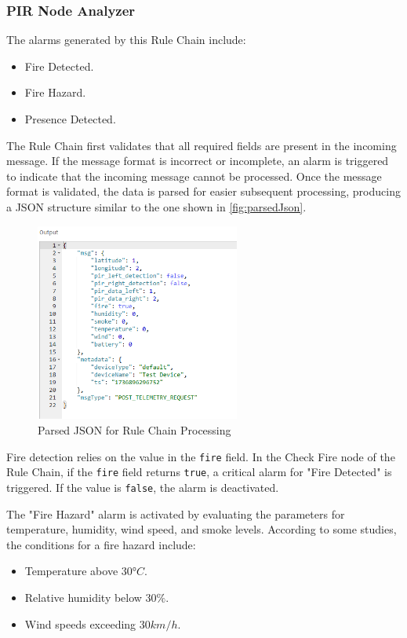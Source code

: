 \subsubsection*{PIR Node Analyzer}
The alarms generated by this Rule Chain include:
\begin{itemize}
    \item Fire Detected.
    \item Fire Hazard.
    \item Presence Detected.
\end{itemize}

The Rule Chain first validates that all required fields are present in the incoming message. If the message format is incorrect or incomplete, an alarm is triggered 
to indicate that the incoming message cannot be processed. Once the message format is validated, the data is parsed for easier subsequent processing, producing a JSON
structure similar to the one shown in \autoref{fig:parsedJson}.

\begin{figure}[H]
    \centering
    \includegraphics[width=0.6\textwidth]{./images/8/jsonParsed.PNG}
    \caption{Parsed JSON for Rule Chain Processing}
    \label{fig:parsedJson}
\end{figure}

Fire detection relies on the value in the \texttt{fire} field. In the Check Fire node of the Rule Chain, if the \texttt{fire} field returns \texttt{true}, a critical alarm for "Fire Detected"
is triggered. If the value is \texttt{false}, the alarm is deactivated.

The "Fire Hazard" alarm is activated by evaluating the parameters for temperature, humidity, wind speed, and smoke levels. According to some studies\cite{norma303030tres}, the conditions 
for a fire hazard include:
\begin{itemize}
    \item Temperature above $30$°$C$.
    \item Relative humidity below $30\%$.
    \item Wind speeds exceeding $30 km/h$.
\end{itemize}

